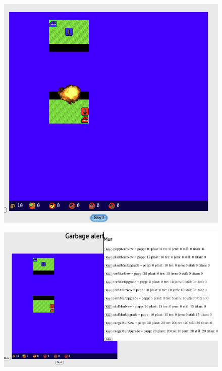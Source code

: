 \begin{center}
\begin{figure}
\includegraphics[scale=0.75]{images/Eksplosjon.png}
\label{fig:Explosjon}
\end{figure}
\end{center}

\begin{center}
\begin{figure}
\includegraphics[scale=0.75]{images/OppgradereMur.png}
\label{fig:OppgradereMur}
\end{figure}
\end{center}

